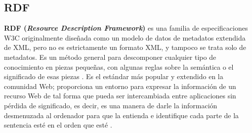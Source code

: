 

\subsection{RDF} %



\textbf{RDF (\textit{Resource Description Framework})} es una familia de especificaciones W3C originalmente diseñada como un modelo de datos de metadatos extendida de XML, pero no es estrictamente un formato XML, y tampoco se trata solo de metadatos. Es un método general para descomponer cualquier tipo de conocimiento en piezas pequeñas, con algunas reglas sobre la semántica o el significado de esas piezas \cite{libro-gis}. Es el estándar más popular y extendido en la comunidad Web; proporciona un entorno para expresar la información de un recurso Web de tal forma que pueda ser intercambiada entre aplicaciones sin pérdida de significado, es decir, es una manera de darle la información desmenuzada al ordenador para que la entienda e identifique cada parte de la sentencia esté en el orden que esté \cite{aplicacion}. 

